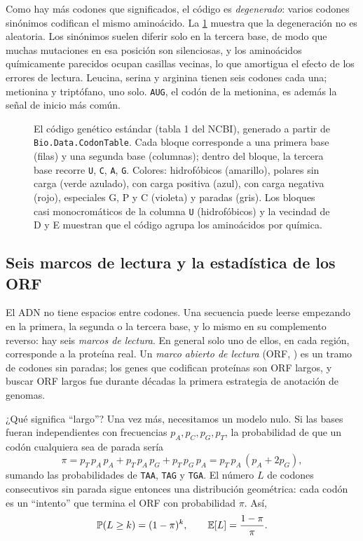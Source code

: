 Como hay más codones que significados, el código es \emph{degenerado}: varios codones sinónimos codifican el mismo aminoácido. La \cref{fig:00-codigo} muestra que la degeneración no es aleatoria. Los sinónimos suelen diferir solo en la tercera base, de modo que muchas mutaciones en esa posición son silenciosas, y los aminoácidos químicamente parecidos ocupan casillas vecinas, lo que amortigua el efecto de los errores de lectura. Leucina, serina y arginina tienen seis codones cada una; metionina y triptófano, uno solo. \texttt{AUG}, el codón de la metionina, es además la señal de inicio más común.

\begin{figure}[t]
\centering
\resizebox{\linewidth}{!}{}
\caption[El código genético estándar]{El código genético estándar (tabla 1 del NCBI), generado a partir de \texttt{Bio.Data.CodonTable}. Cada bloque corresponde a una primera base (filas) y una segunda base (columnas); dentro del bloque, la tercera base recorre \texttt{U}, \texttt{C}, \texttt{A}, \texttt{G}. Colores: hidrofóbicos (amarillo), polares sin carga (verde azulado), con carga positiva (azul), con carga negativa (rojo), especiales G, P y C (violeta) y paradas (gris). Los bloques casi monocromáticos de la columna \texttt{U} (hidrofóbicos) y la vecindad de D y E muestran que el código agrupa los aminoácidos por química.}
\label{fig:00-codigo}
\end{figure}

\subsection{Seis marcos de lectura y la estadística de los ORF}

El ADN no tiene espacios entre codones. Una secuencia puede leerse empezando en la primera, la segunda o la tercera base, y lo mismo en su complemento reverso: hay seis \emph{marcos de lectura}. En general solo uno de ellos, en cada región, corresponde a la proteína real. Un \emph{marco abierto de lectura} (ORF, ) es un tramo de codones sin paradas; los genes que codifican proteínas son ORF largos, y buscar ORF largos fue durante décadas la primera estrategia de anotación de genomas.

¿Qué significa ``largo''? Una vez más, necesitamos un modelo nulo. Si las bases fueran independientes con frecuencias $p_A,p_C,p_G,p_T$, la probabilidad de que un codón cualquiera sea de parada sería
\begin{equation}\label{eq:00-pstop}
\pi = p_T\,p_A\,p_A + p_T\,p_A\,p_G + p_T\,p_G\,p_A = p_T\,p_A\,(p_A + 2p_G),
\end{equation}
sumando las probabilidades de \texttt{TAA}, \texttt{TAG} y \texttt{TGA}. El número $L$ de codones consecutivos sin parada sigue entonces una distribución geométrica: cada codón es un ``intento'' que termina el ORF con probabilidad $\pi$. Así,
\begin{equation}\label{eq:00-geom}
\mathbb{P}(L \ge k) = (1-\pi)^{k}, \qquad \mathbb{E}[L] = \frac{1-\pi}{\pi}.
\end{equation}

